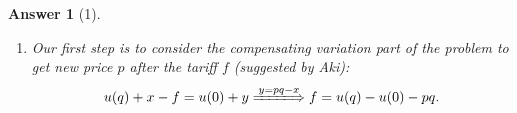 \documentclass{article}
\newtheorem*{ans}{Answer}
\newtheorem{claim}{Claim}
\newcommand{\1}{{\bf 1}}
\newcommand{\0}{{\mathbf{0}}}
\newcommand{\<}{\langle}
\renewcommand{\>}{\rangle}
\begin{document}
\begin{ans}[1]
\begin{enumerate}[(a)]
		\begin{enumerate}[i]
			\item Our first step is to consider the compensating variation part of the problem to get new price $p$ after the tariff $f$ (suggested by Aki):
		\begin{equation}
			u(q) + x -f = u(0) + y \xLongrightarrow{y = pq-x} f = u(q) - u(0) - pq.\label{eq:tariff}
		\end{equation}
%			

\end{enumerate}
\end{enumerate}
\end{ans}
\end{document}
